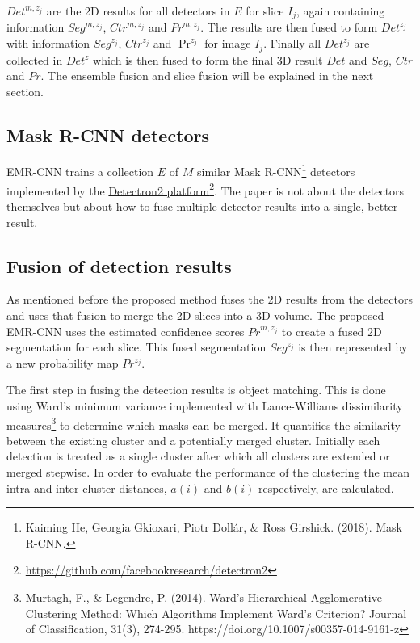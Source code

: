 \documentclass[a4]{article}
\begin{document}
\(Det^{{m},z_{j}}\) are the 2D results for all detectors in \(E\) for slice \(I_j\), again containing information \(Seg^{{m},z_{j}}\), \(Ctr^{{m},z_{j}}\) and \(Pr^{m,z_j}\). The results are then fused to form \(Det^{z_{j}}\) with information  \(Seg^{z_{j}}\), \(Ctr^{z_{j}}\) and \(\Pr^{z_j}\) for image \(I_j\). Finally all \(Det^{z_j}\) are collected in \(Det^z\) which is then fused to form the final 3D result \(Det\) and \(Seg\), \(Ctr\) and \(Pr\). The ensemble fusion and slice fusion will be explained in the next section.

\subsection{Mask R-CNN detectors}

EMR-CNN trains a collection \(E\) of \(M\) similar Mask R-CNN\footnote{Kaiming He, Georgia Gkioxari, Piotr Dollár, \& Ross Girshick. (2018). Mask R-CNN.} detectors implemented by the \href{https://github.com/facebookresearch/detectron2}{Detectron2 platform}\footnote{\href{https://github.com/facebookresearch/detectron2}{https://github.com/facebookresearch/detectron2}\label{detectron2}}. The paper is not about the detectors themselves but about how to fuse multiple detector results into a single, better result.

\subsection{Fusion of detection results}

As mentioned before the proposed method fuses the 2D results from the detectors and uses that fusion to merge the 2D slices into a 3D volume. The proposed EMR-CNN uses the estimated confidence scores \(Pr^{m,z_{j}}\) to create a fused 2D segmentation for each slice. This fused segmentation \(Seg^{z_j}\) is then represented by a new probability map \(Pr^{z_j}\).

The first step in fusing the detection results is object matching. This is done using Ward's minimum variance implemented with Lance-Williams dissimilarity measures\footnote{Murtagh, F., \& Legendre, P. (2014). Ward’s Hierarchical Agglomerative Clustering Method: Which Algorithms Implement Ward’s Criterion? Journal of Classification, 31(3), 274-295. https://doi.org/10.1007/s00357-014-9161-z} to determine which masks can be merged. It quantifies the similarity between the existing cluster and a potentially merged cluster. Initially each detection is treated as a single cluster after which all clusters are extended or merged stepwise. In order to evaluate the performance of the clustering the mean intra and inter cluster distances, \(a(i)\) and \(b(i)\) respectively, are calculated.
\end{document}

